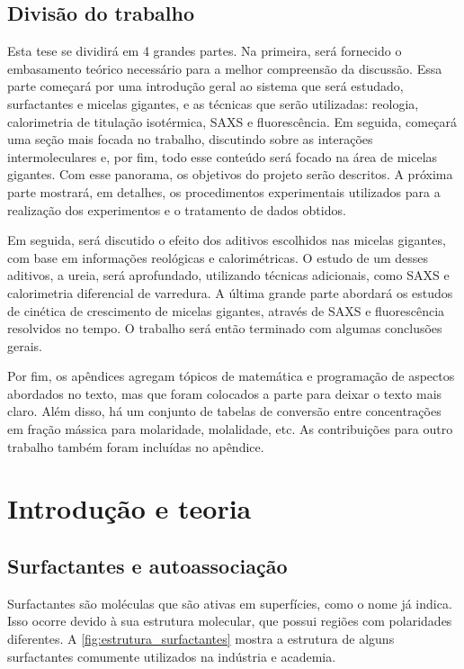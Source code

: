 
	\chapter*{Divisão do trabalho}
	\setcounter{page}{36}
Esta tese se dividirá em 4 grandes partes. Na primeira, será fornecido o embasamento teórico necessário para a melhor compreensão da discussão. Essa parte começará por uma introdução geral ao sistema que será estudado, surfactantes e micelas gigantes, e as técnicas que serão utilizadas: reologia, calorimetria de titulação isotérmica, SAXS e fluorescência. Em seguida, começará uma seção mais focada no trabalho, discutindo sobre as interações intermoleculares e, por fim, todo esse conteúdo será focado na área de micelas gigantes. Com esse panorama, os objetivos do projeto serão descritos. A próxima parte mostrará, em detalhes, os procedimentos experimentais utilizados para a realização dos experimentos e o tratamento de dados obtidos.

Em seguida, será discutido o efeito dos aditivos escolhidos nas micelas gigantes, com base em informações reológicas e calorimétricas. O estudo de um desses aditivos, a ureia, será aprofundado, utilizando técnicas adicionais, como SAXS e calorimetria diferencial de varredura. A última grande parte abordará os estudos de cinética de crescimento de micelas gigantes, através de SAXS e fluorescência resolvidos no tempo. O trabalho será então terminado com algumas conclusões gerais.

Por fim, os apêndices agregam tópicos de matemática e programação de aspectos abordados no texto, mas que foram colocados a parte para deixar o texto mais claro. Além disso, há um conjunto de tabelas de conversão entre concentrações em fração mássica para molaridade, molalidade, etc. As contribuições para outro trabalho também foram incluídas no apêndice.

\part{Introdução e teoria}


	\chapter{Surfactantes e autoassociação}
	\label{sec:surfactantes_autoassociação}
	Surfactantes são moléculas que são ativas em superfícies, como o nome já indica.\cite{Lindman_livro} Isso ocorre devido à sua estrutura molecular, que possui regiões com polaridades diferentes. A \autoref{fig:estrutura_surfactantes} mostra a estrutura de alguns surfactantes comumente utilizados na indústria e academia.
	
